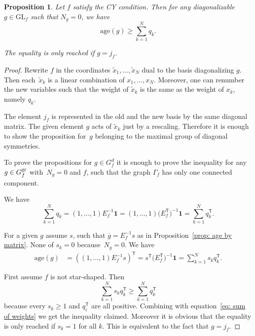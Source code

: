 \documentclass[pdftex]{sigma}
\numberwithin{equation}{section}
\newtheorem{Proposition}[Theorem]{Proposition}
 { \theoremstyle{definition}
\newtheorem{Definition}[Theorem]{Definition}
\newtheorem{Note}[Theorem]{Note}
\newtheorem{Example}[Theorem]{Example}
\newtheorem{Remark}[Theorem]{Remark} }
\newcommand{\GL}{{\mathrm{GL}}}
\newcommand{\age}{\mathrm{age}}
\begin{document}
\begin{Proposition}\label{prop: age greater than weights}
 Let $f$ satisfy the CY condition.
	Then for any diagonalizable $g \in \GL_f$ such that $N_g = 0$, we have
	\begin{equation*}
		\age(g) \ge \sum_{k=1}^N q_k.
	\end{equation*}

	The equality is only reached if $g = j_f$.
\end{Proposition}
\begin{proof}
Rewrite $f$ in the coordinates $\widetilde x_1,\dots,\widetilde x_N$ dual to the basis diagonalizing $g$. Then each~$\widetilde x_k$ is a linear combination of $x_1,\dots,x_N$. Moreover, one can renumber the new variables such that the weight of $\widetilde x_k$ is the same as the weight of $x_k$, namely $q_k$.

The element $j_f$ is represented in the old and the new basis by the same diagonal matrix. The given element $g$ acts of $\widetilde x_k$ just by a rescaling. Therefore it is enough to show the proposition for~$g$ belonging to the maximal group of diagonal symmetries.

To prove the propositions for $g \in G_f^d$ it is enough to prove the inequality for any $g \in G_f^{\rm gr}$ with~$N_g=0$ and $f$, such that the graph $\Gamma_f$ has only one connected component.

We have
\begin{equation}\label{eq: sum of weights}
	 \sum_{k=1}^N q_k = (1,\dots,1) E_f^{-1} \boldsymbol{1} = (1,\dots,1) \bigl(E_f^{\mathsf{T}}\bigr)^{-1} \boldsymbol{1} = \sum_{k=1}^N q_k^{\mathsf{T}}.
\end{equation}

For a given $g$ assume $s$, such that $\overline g = E_f^{-1}s$ as in Proposition~\ref{prop: age by matrix}. None of $s_k =0$ because~$N_g=0$. We have
\begin{align*}
	\age(g) &= ( (1,\dots,1) E_f^{-1} s )^{\mathsf{T}} = s^{\mathsf{T}} \bigl(E_f^{\mathsf{T}}\bigr)^{-1} \boldsymbol{1} = \sum_{k=1}^N s_k q_k^{\mathsf{T}}.
\end{align*}

First assume $f$ is not star-shaped. Then
\[
 \sum_{k=1}^N s_k q_k^{\mathsf{T}} \ge \sum_{k=1}^N q_k^{\mathsf{T}}
\]
because every $s_k \ge 1$ and $q_i^{\mathsf{T}}$ are all positive. Combining with equation~\eqref{eq: sum of weights} we get the inequality claimed. Moreover it is obvious that the equality is only reached if $s_k=1$ for all $k$. This is equivalent to the fact that $g = j_f$.


\end{proof}
\end{document}
